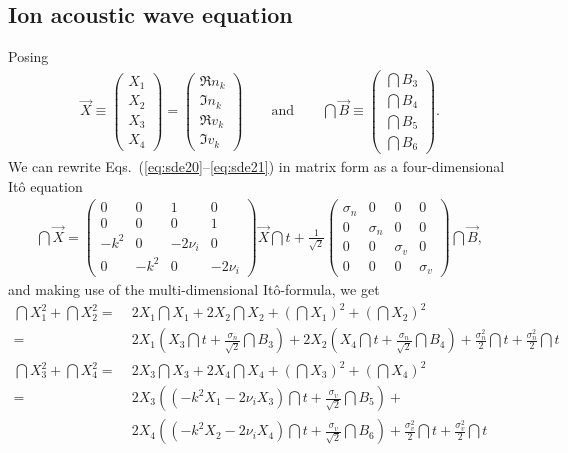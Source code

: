 \documentclass[10pt,a4paper]{article}
\newcommand{\eqs}[2]{Eqs.~(\ref{#1}--\ref{#2})}
\begin{document}
\subsection{Ion acoustic wave equation}
Posing
\begin{align}
\vec{X}\equiv
\begin{pmatrix}X_1\\X_2\\X_3\\X_4\end{pmatrix}=
\begin{pmatrix}\Re{n_{k}}\\\Im{n_{k}}\\\Re{v_{k}}\\\Im{v_{k}}\end{pmatrix}
\qquad\text{and}\qquad
\dint{\vec{B}}\equiv
\begin{pmatrix}\dint{B_3}\\\dint{B_4}\\\dint{B_5}\\\dint{B_6}\end{pmatrix}.
\end{align}
We can rewrite \eqs{eq:sde20}{eq:sde21} in matrix form as a 
four-dimensional It\^o equation
\begin{align}
\dint{\vec{X}}=
\begin{pmatrix}
0&0&1&0\\0&0&0&1\\{-}k^2&0&{-}2\nu_i&0\\0&{-}k^2&0&{-}2\nu_i
\end{pmatrix}
\vec{X}\dint{t}+
\frac{1}{\sqrt{2}}
\begin{pmatrix}
\sigma_n&0&0&0\\0&\sigma_n&0&0\\0&0&\sigma_v&0\\0&0&0&\sigma_v
\end{pmatrix}\dint{\vec{B}},
\end{align}
and making use of the multi-dimensional It\^o-formula, we get
\begin{align}
\dint{X_1^2}+\dint{X_2^2} = &\; 
2X_1\dint{X_1}+2X_2\dint{X_2}+(\dint{X_1})^2+(\dint{X_2})^2\nonumber\\
= &\;
2X_1\left(X_3\dint{t}+\frac{\sigma_n}{\sqrt{2}}\dint{B_3}\right)+
2X_2\left(X_4\dint{t}+\frac{\sigma_n}{\sqrt{2}}\dint{B_4}\right)+
\frac{\sigma_n^2}{2}\dint{t}+\frac{\sigma_n^2}{2}\dint{t}\nonumber\\
\dint{X_3^2}+\dint{X_4^2} = &\; 
2X_3\dint{X_3}+2X_4\dint{X_4}+(\dint{X_3})^2+(\dint{X_4})^2\nonumber\\
= &\; 2X_3 \left(\left(-k^2X_1-2\nu_iX_3\right)\dint{t}+
\frac{\sigma_v}{\sqrt{2}}\dint{B_5}\right)+ \nonumber\\
&\; 2X_4 \left(\left(-k^2X_2-2\nu_iX_4\right)\dint{t}+
\frac{\sigma_v}{\sqrt{2}}\dint{B_6}\right)+
\frac{\sigma_v^2}{2}\dint{t}+\frac{\sigma_v^2}{2}\dint{t}\nonumber
\end{align}
\end{document}
